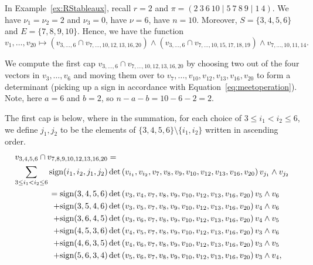 \begin{example}\label{ex:cap}
In Example~\ref{ex:RStableaux}, recall $r=2$ and $\pi=(2~3~6~10 \mid 5~7~8~9 \mid 1~4)$. We have $\nu_1 = \nu_2 = 2$ and $\nu_3 = 0$, have $\nu = 6$, have $n=10$. Moreover, $S = \{3,4,5,6\}$ and $E = \{7,8,9,10\}$.
Hence, we have the function 
\[v_1,\dots,v_{20} \mapsto \left(v_{3,\dots,6} \cap v_{7,\dots,10, 12, 13, 16, 20} \right) \wedge \left(v_{3,\dots,6} \cap v_{7,\dots,10, 15, 17, 18, 19} \right) \wedge v_{7,\dots,10, 11, 14}.\]

We compute the first cap $v_{3,\dots,6} \cap v_{7,\dots,10, 12, 13, 16, 20}$ by choosing two out of the four vectors in $v_{3},\dots,v_{6}$ and moving them over to $v_7,\dots,v_{10},v_{12},v_{13},v_{16},v_{20}$ to form a determinant (picking up a sign in accordance with Equation~\eqref{eq:meetoperation}). Note, here $a=6$ and $b=2$, so $n -a-b = 10-6-2 = 2$.

The first cap is below, where in the summation, for each choice of $3 \leq i_1 < i_2 \leq 6$, we define $j_1,j_{2}$ to be the elements of $\{3,4,5,6\} \setminus \{i_1,i_2\}$ written in ascending order. 
\begin{align*}
v_{3,4,5,6} \cap v_{7,8,9,10,12,13,16,20} &= \\ \sum_{3\leq i_1 < i_2\leq 6} {\rm sign}(i_1,i_2,j_1,j_{2}) &\det\left(v_{i_1},v_{i_2}, v_{7}, v_{8}, v_{9}, v_{10},v_{12}, v_{13}, v_{16}, v_{20}\right)v_{j_1} \wedge v_{j_{2}}\nonumber \\
= {\rm sign}(3,4,5,6) &\det\left(v_{3},v_{4}, v_{7}, v_{8}, v_{9}, v_{10},v_{12}, v_{13}, v_{16}, v_{20}\right)v_{5} \wedge v_{6} \nonumber \\
+ {\rm sign}(3,5,4,6) &\det\left(v_{3},v_{5}, v_{7}, v_{8}, v_{9}, v_{10},v_{12}, v_{13}, v_{16}, v_{20}\right)v_{4} \wedge v_{6} \nonumber \\
+ {\rm sign}(3,6,4,5) &\det\left(v_{3},v_{6}, v_{7}, v_{8}, v_{9}, v_{10},v_{12}, v_{13}, v_{16}, v_{20}\right)v_{4} \wedge v_{5} \nonumber \\
+ {\rm sign}(4,5,3,6) &\det\left(v_{4},v_{5}, v_{7}, v_{8}, v_{9}, v_{10},v_{12}, v_{13}, v_{16}, v_{20}\right)v_{3} \wedge v_{6} \nonumber \\
+ {\rm sign}(4,6,3,5) &\det\left(v_{4},v_{6}, v_{7}, v_{8}, v_{9}, v_{10},v_{12}, v_{13}, v_{16}, v_{20}\right)v_{3} \wedge v_{5} \nonumber \\
+ {\rm sign}(5,6,3,4) &\det\left(v_{5},v_{6}, v_{7}, v_{8}, v_{9}, v_{10},v_{12}, v_{13}, v_{16}, v_{20}\right)v_{3} \wedge v_{4} \nonumber ,
\end{align*}



\end{example}
